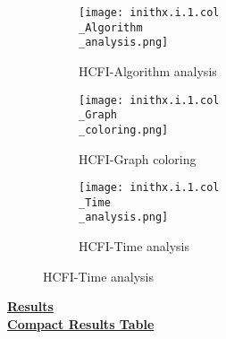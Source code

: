 \documentclass[10pt]{article}
\begin{document}
\graphicspath{{./Core1/Solutions/HCFI/inithx.i.1.col}}
\begin{figure}[H]
\begin{subfigure}{.33\textwidth}
  \centering
  \texttt{[image: inithx.i.1.col\\\_Algorithm\\\_analysis.png]}
  \caption{HCFI-Algorithm analysis}
   \label{fig:subfig1}
\end{subfigure}%
\begin{subfigure}{.33\textwidth}
  \centering
  \texttt{[image: inithx.i.1.col\\\_Graph\\\_coloring.png]}
  \caption{HCFI-Graph coloring}
  \label{fig:subfig2}
\end{subfigure}
\begin{subfigure}{.33\textwidth}
  \centering
  \texttt{[image: inithx.i.1.col\\\_Time\\\_analysis.png]}
  \caption{HCFI-Time analysis}
  \end{subfigure}
\end{figure}
\vspace{2cm}
\begin{center}
\hyperlink{page.8}{\textbf{Results}}\\
\vspace{0.5cm}
\hyperlink{page.71}{\textbf{Compact Results Table}}
\end{center}
\pagebreak
\end{document}
